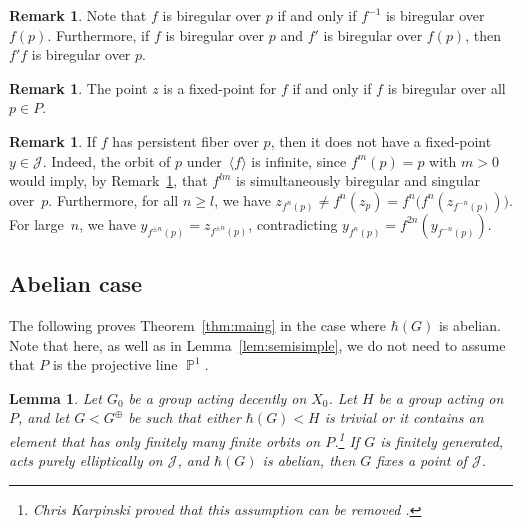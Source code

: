 \documentclass[11pt]{article}
\numberwithin{equation}{section}
\newcommand{\p}{\operatorname{\mathbb{P}}}\let\P\p
\newcommand{\Jon}{\mathscr{J}}
\theoremstyle{plain}
\newtheorem{lemma}[theorem]{Lemma}
\theoremstyle{definition}
\newtheorem{remark}[theorem]{Remark}
\begin{document}
\begin{remark}
\label{rem:regular}
Note that $f$ is biregular over $p$ if and only if $f^{-1}$ is biregular over~$f(p)$. Furthermore, if $f$ is biregular over $p$ and $f'$ is biregular over $f(p)$, then $f'f$ is biregular over $p$.
\end{remark}

\begin{remark}
\label{rem:fixed}
The point $z$ is a fixed-point for $f$ if and only if $f$ is biregular over all $p\in P$.
\end{remark}

\begin{remark}
\label{rem:per}
If $f$ has persistent fiber over $p$, then it does not have a fixed-point $y\in \Jon$. Indeed, the orbit of $p$ under~$\langle f\rangle$ is infinite, since $f^m(p)=p$ with $m>0$ would imply, by Remark~\ref{rem:regular}, that $f^{l m}$ is simultaneously biregular and singular over~$p$. Furthermore, for all $n\geq l$, we have $z_{f^{n}(p)}\neq f^{n}(z_p)=f^n\big(f^n(z_{f^{-n}(p)})\big)$.
For large~$n$, we have $y_{f^{\pm n}(p)}=z_{f^{\pm n}(p)}$, contradicting $y_{f^{n}(p)}=f^{2n}(y_{f^{-n}(p)})$.
\end{remark}

\subsection{Abelian case}

The following proves Theorem~\ref{thm:maing} in the case where $\hbar(G)$ is abelian. Note that here, as well as in Lemma~\ref{lem:semisimple}, we do not need to assume that $P$ is the projective line $\p^1$.

\begin{lemma}
\label{lem:abel}
Let $G_0$ be a group acting decently on $X_0$. Let $H$ be a group acting on~$P$, and let $G<G^\oplus$ be such that either $\hbar(G)<H$ is trivial or it contains an element that has only finitely many finite orbits on $P$.\footnote{Chris Karpinski proved that this assumption can be removed \cite{Karpinski24}.} If $G$ is finitely generated, acts purely elliptically on $\Jon$, and $\hbar(G)$ is abelian, then $G$ fixes a point of $\Jon$.
\end{lemma}
\end{document}
